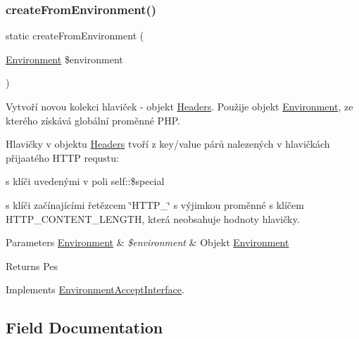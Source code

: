 \subsubsection{\texorpdfstring{create\+From\+Environment()}{createFromEnvironment()}}
{\footnotesize\ttfamily static create\+From\+Environment (\begin{DoxyParamCaption}\item[{\mbox{\hyperlink{class_pes_1_1_http_1_1_environment}{Environment}}}]{\$environment }\end{DoxyParamCaption})}

Vytvoří novou kolekci hlaviček -\/ objekt \mbox{\hyperlink{class_pes_1_1_http_1_1_headers}{Headers}}. Použije objekt \mbox{\hyperlink{class_pes_1_1_http_1_1_environment}{Environment}}, ze kterého získává globální proměnné P\+HP. 

Hlavičky v objektu \mbox{\hyperlink{class_pes_1_1_http_1_1_headers}{Headers}} tvoří z key/value párů nalezených v hlavičkách přijaatého H\+T\+TP requstu\+: 
\begin{DoxyItemize}
\item s klíči uvedenými v poli self\+::\$special  
\item s klíči začínajícími řetězcem \char`\"{}\+H\+T\+T\+P\+\_\+\char`\"{} s výjimkou proměnné s klíčem H\+T\+T\+P\+\_\+\+C\+O\+N\+T\+E\+N\+T\+\_\+\+L\+E\+N\+G\+TH, která neobsahuje hodnoty hlavičky. 
\end{DoxyItemize}


\begin{DoxyParams}[1]{Parameters}
\mbox{\hyperlink{class_pes_1_1_http_1_1_environment}{Environment}} & {\em \$environment} & Objekt \mbox{\hyperlink{class_pes_1_1_http_1_1_environment}{Environment}}\\
\hline
\end{DoxyParams}
\begin{DoxyReturn}{Returns}
Pes 
\end{DoxyReturn}


Implements \mbox{\hyperlink{interface_pes_1_1_http_1_1_factory_1_1_environment_accept_interface}{Environment\+Accept\+Interface}}.



\subsection{Field Documentation}
\mbox{\label{class_pes_1_1_http_1_1_factory_1_1_headers_factory_aac9b8e6c2865946aa0c0155dfbd03c99}} 
